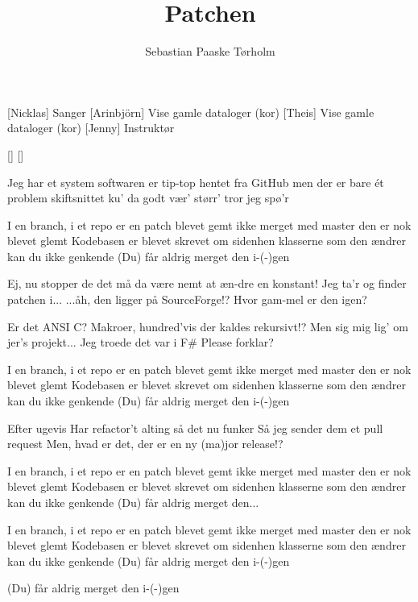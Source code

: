 \documentclass[a4paper,11pt]{article}
\title{Patchen}
\author{Sebastian Paaske Tørholm}
\begin{document}
\maketitle

\begin{roles}
[Nicklas] Sanger
[Arinbjörn] Vise gamle dataloger (kor)
[Theis] Vise gamle dataloger (kor)
[Jenny] Instruktør
\end{roles}

\begin{props}
[]
[]
\end{props}

\begin{song}
%
Jeg har et system
softwaren er tip-top
hentet fra GitHub
men der er bare ét problem
skiftsnittet ku' da godt vær' størr'
tror jeg spø'r

%
I en branch, i et repo
er en patch blevet gemt
ikke merget med master
den er nok blevet glemt
Kodebasen er blevet
skrevet om sidenhen
klasserne som den ændrer
kan du ikke genkende
(Du) får aldrig merget den i-(-)gen

%
Ej, nu stopper de
det må da være nemt
at æn-dre en konstant!
Jeg ta'r og finder patchen i...
...åh, den ligger på SourceForge!?
Hvor gam-mel er den igen?

Er det ANSI C?
Makroer, hundred'vis
der kaldes rekursivt!?
Men sig mig lig' om jer's projekt...
Jeg troede det var i F\#
Please forklar?

%
I en branch, i et repo
er en patch blevet gemt
ikke merget med master
den er nok blevet glemt
Kodebasen er blevet
skrevet om sidenhen
klasserne som den ændrer
kan du ikke genkende
(Du) får aldrig merget den i-(-)gen

%
Efter ugevis
Har refactor't alting så
det nu funker
Så jeg sender dem et pull request
Men, hvad er det, der er en ny
(ma)jor release!?

%
I en branch, i et repo
er en patch blevet gemt
ikke merget med master
den er nok blevet glemt
Kodebasen er blevet
skrevet om sidenhen
klasserne som den ændrer
kan du ikke genkende
(Du) får aldrig merget den...

I en branch, i et repo
er en patch blevet gemt
ikke merget med master
den er nok blevet glemt
Kodebasen er blevet
skrevet om sidenhen
klasserne som den ændrer
kan du ikke genkende
(Du) får aldrig merget den i-(-)gen

(Du) får aldrig merget den i-(-)gen

\end{song}
\end{document}
